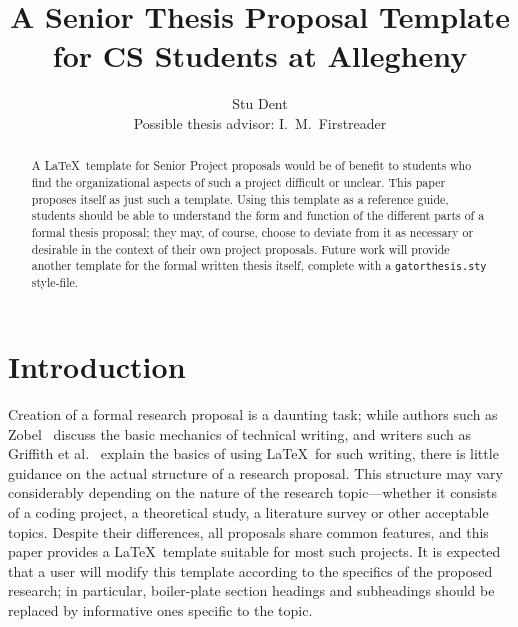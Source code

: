 \documentclass[11pt]{article}
\title{A Senior Thesis Proposal Template for CS Students at Allegheny}
\author{Stu Dent \\ Possible thesis advisor:  I.\ M.\ Firstreader}
\begin{document}
\lstset{language=C++,basicstyle=\small,
        stringstyle=\ttfamily,showstringspaces=false}

\singlespace
\maketitle

\begin{abstract}                %
A \LaTeX\ template for Senior Project proposals would be of benefit to
students who find the organizational aspects of such a project
difficult or unclear.  This paper proposes itself as just such a
template.  Using this template as a reference guide, students should be
able to understand the form and function of the different parts of a
formal thesis proposal; they may, of course, choose to deviate from it
as necessary or desirable in the context of their own project
proposals.  Future work will provide another template for the formal written
thesis itself, complete with a {\tt gatorthesis.sty} style-file.
\end{abstract}

\doublespace
\setcounter{secnumdepth}{2}

\section{Introduction}\label{ch:overview}

Creation of a formal research proposal is a daunting task; while authors
such as Zobel~\cite{zobel:97} discuss the basic mechanics of technical
writing, and writers such as Griffith et al.~\cite{griffiths:97}
explain the basics of using \LaTeX\ for such writing, there is little
guidance on the actual structure of a research proposal.
This structure may vary considerably depending on the nature of the
research topic---whether it consists of a coding project, a theoretical
study, a literature survey or other acceptable topics.  Despite their
differences, all proposals share common features, and this paper provides
a \LaTeX\ template suitable for most such projects.  It is expected that
a user will modify this template according to the specifics of the
proposed research; in particular, boiler-plate section headings
and subheadings should be replaced by informative ones specific to
the topic.
\end{document}
